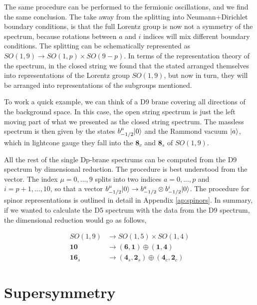 The same procedure can be performed to the fermionic oscillations, and we find the same conclusion. The take away from the splitting into Neumann+Dirichlet boundary conditions, is that the full Lorentz group is now not a symmetry of the spectrum, because rotations between $a$ and $i$ indices will mix different boundary conditions. The splitting can be schematically represented as $SO(1,9) \rightarrow SO(1,p) \times SO(9-p)$. In terms of the representation theory of the spectrum, in the closed string we found that the stated arranged themselves into representations of the Lorentz group $SO(1,9)$, but now in turn, they will be arranged into representations of the subgroups mentioned.

To work a quick example, we can think of a D9 brane covering all directions of the background space. In this case, the open string spectrum is just the left moving part of what we presented as the closed string spectrum. The massless spectrum is then given by the states $b_{-1/2}^\mu \lvert0\rangle$ and the Rammond vacuum $\lvert a\rangle$, which in lightcone gauge they fall into the $\mathbf{8}_v$ and $\mathbf{8}_s$ of $SO(1,9)$.

All the rest of the single Dp-brane spectrums can be computed from the D9 spectrum by dimensional reduction. The procedure is best understood from the vector. The index $\mu = 0,...,9$ splits into two indices $a = 0,...,p$ and $i = p+1,...,10$, so that a vector $b_{-1/2}^\mu \lvert0\rangle \rightarrow b_{-1/2}^a \otimes b_{-1/2}^i \lvert0\rangle$. The procedure for spinor representations is outlined in detail in Appendix \ref{ap:spinors}. In summary, if we wanted to calculate the D5 spectrum with the data from the D9 spectrum, the dimensional reduction would go as follows,

\begin{align*}
    SO(1,9) &\rightarrow SO(1,5) \times SO(1,4) \\
    \mathbf{10} &\rightarrow (\mathbf{6},\mathbf{1}) \oplus (\mathbf{1}, \mathbf{4}) \\
    \mathbf{16}_s &\rightarrow (\mathbf{4}_s, \mathbf{2}_s) \oplus (\mathbf{4}_c, \mathbf{2}_c)
\end{align*}

\section{Supersymmetry}

